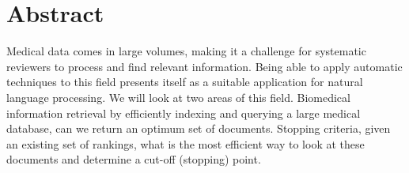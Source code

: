 \chapter*{\Large \center Abstract}

Medical data comes in large volumes, making it a challenge for systematic reviewers to process and find relevant information. Being able to apply automatic techniques to this field presents itself as a suitable application for natural language processing. We will look at two areas of this field. Biomedical information retrieval by efficiently indexing and querying a large medical database, can we return an optimum set of documents. Stopping criteria, given an existing set of rankings, what is the most efficient way to look at these documents and determine a cut-off (stopping) point.
 
